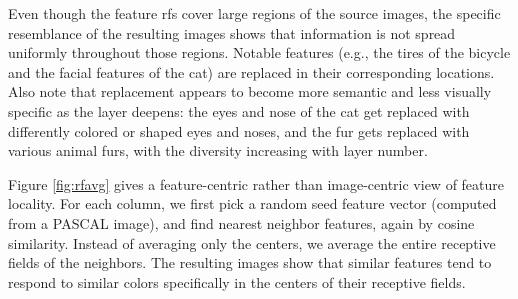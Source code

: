 \documentclass{article} \usepackage{nips14submit_e,times}
\begin{document}
Even though the feature rfs cover large regions of the source images, the
specific resemblance of the resulting images shows that information is not
spread uniformly throughout those regions.
Notable features (e.g., the tires of the bicycle and the facial features of the
cat) are replaced in their corresponding locations.
Also note that replacement appears to become more semantic and less visually
specific as the layer deepens: the eyes and nose of the cat get replaced with
differently colored or shaped eyes and noses, and the fur gets replaced with
various animal furs, with the diversity increasing with layer number.

Figure \ref{fig:rfavg} gives a feature-centric rather than image-centric view of
feature locality.
For each column, we first pick a random seed feature vector (computed from
a PASCAL image), and find  nearest neighbor features, again by cosine
similarity.
Instead of averaging only the centers, we average the entire receptive fields of
the neighbors.
The resulting images show that similar features tend to respond to similar
colors specifically in the centers of their receptive fields.
\end{document}
